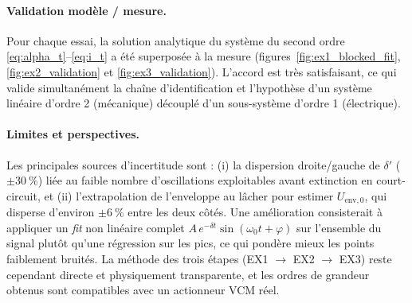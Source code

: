 \paragraph{Validation modèle / mesure.} Pour chaque essai, la solution analytique du système du second ordre \eqref{eq:alpha_t}--\eqref{eq:i_t} a été superposée à la mesure (figures~\ref{fig:ex1_blocked_fit}, \ref{fig:ex2_validation} et \ref{fig:ex3_validation}). L'accord est très satisfaisant, ce qui valide simultanément la chaîne d'identification et l'hypothèse d'un système linéaire d'ordre 2 (mécanique) découplé d'un sous-système d'ordre 1 (électrique).

\paragraph{Limites et perspectives.}
Les principales sources d'incertitude sont : (i) la dispersion droite/gauche de \(\delta'\) (\(\pm\SI{30}{\%}\)) liée au faible nombre d'oscillations exploitables avant extinction en court-circuit, et (ii) l'extrapolation de l'enveloppe au lâcher pour estimer \(U_{\text{env},0}\), qui disperse d'environ \(\pm\SI{6}{\%}\) entre les deux côtés. Une amélioration consisterait à appliquer un \emph{fit} non linéaire complet \(A\,e^{-\delta t}\sin(\omega_0 t + \varphi)\) sur l'ensemble du signal plutôt qu'une régression sur les pics, ce qui pondère mieux les points faiblement bruités. La méthode des trois étapes (EX1 \(\to\) EX2 \(\to\) EX3) reste cependant directe et physiquement transparente, et les ordres de grandeur obtenus sont compatibles avec un actionneur VCM réel.
